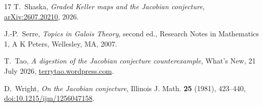 \begin{thebibliography}{17}
T.~Shaska,
\emph{Graded Keller maps and the Jacobian conjecture},
\href{https://arxiv.org/abs/2607.20210}{arXiv:2607.20210}, 2026.

J.-P.~Serre,
\emph{Topics in Galois Theory},
second ed., Research Notes in Mathematics 1,
A K Peters, Wellesley, MA, 2007.

T.~Tao,
\emph{A digestion of the Jacobian conjecture counterexample},
What's New, 21 July 2026,
\href{https://terrytao.wordpress.com/2026/07/21/a-digestion-of-the-jacobian-conjecture-counterexample/}
{terrytao.wordpress.com}.

D.~Wright,
\emph{On the Jacobian conjecture},
Illinois J. Math. \textbf{25} (1981), 423--440,
\href{https://doi.org/10.1215/ijm/1256047158}
{doi:10.1215/ijm/1256047158}.

\end{thebibliography}
